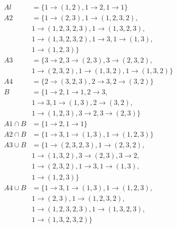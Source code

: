 \documentclass[a4paper,12pt]{article}
\begin{document}
\begin{align*}
	Al &= \{1 \longrightarrow (1,2), 1 \longrightarrow 2, 1 \longrightarrow 1\} \\
	A2 &= \{1 \longrightarrow (2,3), 1 \longrightarrow (1,2,3,2),\\
	&  1 \longrightarrow (1,2,3,2,3), 1 \longrightarrow (1,3,2,3),\\
	&  1 \longrightarrow (1,3,2,3,2), 1 \longrightarrow 3, 1 \longrightarrow (1,3),\\
	&  1 \longrightarrow (1,2,3) \} \\
	A3 &= \{3 \longrightarrow 2, 3 \longrightarrow (2,3), 3 \longrightarrow (2,3,2),\\
	&  1 \longrightarrow (2,3,2), 1 \longrightarrow (1,3,2), 1 \longrightarrow (1,3,2) \} \\
	A4 &= \{2 \longrightarrow (3,2,3), 2 \longrightarrow 3, 2 \longrightarrow (3,2) \} \\
	B &= \{1 \longrightarrow 2, 1 \longrightarrow 1, 2 \longrightarrow 3,\\
	&  1 \longrightarrow 3, 1 \longrightarrow (1,3), 2 \longrightarrow (3,2),\\
	&  1 \longrightarrow (1,2,3), 3 \longrightarrow 2, 3 \longrightarrow (2,3)\}\\
	A1 \cap B &= \{1 \longrightarrow 2, 1 \longrightarrow 1\} \\
	A2 \cap B &= \{1 \longrightarrow 3, 1 \longrightarrow (1,3), 1 \longrightarrow (1,2,3)\}\\
	A3 \cup B &= \{1 \longrightarrow (2,3,2,3), 1 \longrightarrow (2,3,2), \\
	&  1 \longrightarrow (1,3,2), 3 \longrightarrow (2,3), 3 \longrightarrow 2,\\
	&  1 \longrightarrow (2,3,2), 1 \longrightarrow 3, 1 \longrightarrow (1,3),\\
	&  1 \longrightarrow (1,2,3) \} \\
	A4 \cup B &= \{1 \longrightarrow 3, 1 \longrightarrow (1,3), 1 \longrightarrow (1,2,3), \\
	&  1 \longrightarrow (2,3), 1 \longrightarrow (1,2,3,2),\\
	&  1 \longrightarrow (1,2,3,2,3), 1 \longrightarrow (1,3,2,3),\\
	&  1 \longrightarrow (1,3,2,3,2) \} \\
\end{align*}


\section{}
\end{document}
